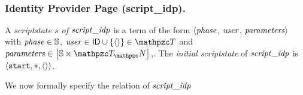 \begin{algorithmic}[1]
    \ENDIF
  \ENDCASE
      \ENDIF
    \ENDIF
  \ENDCASE
  \ENDSWITCH\\
  \end{algorithmic}\setlength{\parindent}{1em}
  
  \subsubsection{Identity Provider Page (script\_idp).}\label{app:uppresso-script-Idp}
  
  \begin{definition}\label{def:scriptstateidp}
    A \emph{scriptstate $s$ of $\mathit{script\_idp}$} is a term of the form
    $\langle \mathit{phase}$, $\mathit{user}$, $\mathit{parameters} \rangle$ with $\mathit{phase} \in
    \mathbb{S}$, $\mi{user} \in \IDs \cup \{\an{}\} \in \gterms$ and $\mi{parameters} \in \dict{\mathbb{S}}{\terms}$,. The 
    \emph{initial scriptstate} of $\mathit{script\_idp}$ is $\langle\mathtt{start},*,\langle {{}\rangle} \rangle$.
  \end{definition}
  
  We now formally specify the relation of $\mathit{script\_idp}$
  
